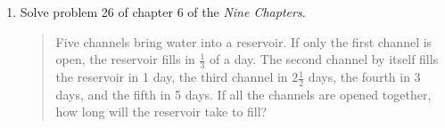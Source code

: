 \begin{exercisessec}{}{}
\begin{enumerate}
  \item%
  Solve problem 26 of chapter 6 of the \emph{Nine Chapters.}
  \begin{quote}
  Five channels bring water into a reservoir. If only the first channel is open, the reservoir fills in $\frac 13$ of a day. The second channel by itself fills the reservoir in 1 day, the third channel in $2\frac 12$ days, the fourth in 3 days, and the fifth in 5 days. If all the channels are opened together, how long will the reservoir take to fill?
  \end{quote}

\end{enumerate}  


  \end{exercisessec}